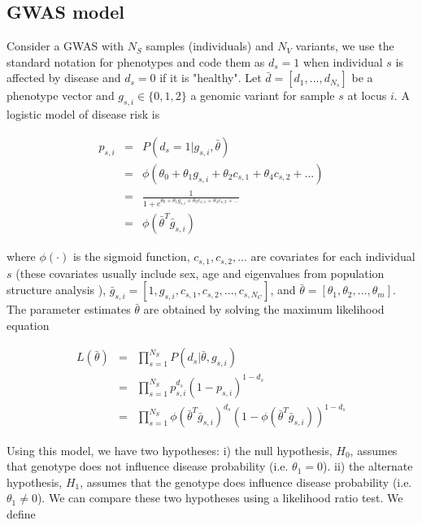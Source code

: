 \subsection{GWAS model}

Consider a GWAS with $N_S$  samples (individuals) and $N_V$ variants, we use the standard notation for phenotypes and code them as $d_s=1$ when individual $s$ is affected by disease and $d_s=0$ if it is "healthy". Let $\bar{d} = [d_1, ..., d_{N_s}]$ be a phenotype vector and $g_{s,i} \in \{0,1,2\}$ a genomic variant for sample $s$ at locus $i$. A logistic model of disease risk \cite{balding2006tutorial} is

\begin{eqnarray*}
    p_{s,i} & = & P( d_s=1 | g_{s,i}, \bar{\theta} ) \\
    & = & \phi( \theta_0 + \theta_1 g_{s,i} + \theta_2 c_{s,1} + \theta_4 c_{s,2} + ... ) \\
    & = & \frac{1}{1 + e^{\theta_0 + \theta_1 g_{s,i} + \theta_2 c_{s,1} + \theta_4 c_{s,2} + ...}} \\
    & = & \phi( \bar{\theta}^T \bar{g}_{s,i})
\end{eqnarray*}

\noindent where $\phi(\cdot)$ is the sigmoid function, $c_{s,1}, c_{s,2}, ... $ are covariates for each individual $s$ (these covariates usually include sex, age and eigenvalues from population structure analysis \cite{price2006principal}), $\bar{g}_{s,i} = [ 1, g_{s,i} , c_{s,1}, c_{s,2}, ... , c_{s,N_C} ]$, and $\bar{\theta} = [\theta_1, \theta_2, ..., \theta_m] $. The parameter estimates $\bar{\theta}$ are obtained by solving the maximum likelihood equation

\begin{eqnarray*}
    L( \bar{\theta} ) & = & \prod_{s=1}^{N_S}{ P( d_s | \bar{\theta}, g_{s,i} ) } \\
    & = & \prod_{s=1}^{N_S}{ p_{s,i}^{d_s} (1-p_{s,i})^{1-d_s} } \\
    & = & \prod_{s=1}^{N_S}{ \phi( \bar{\theta}^T \bar{g}_{s,i})^{d_s} (1-\phi( \bar{\theta}^T \bar{g}_{s,i}))^{1-d_s} }
\end{eqnarray*}


Using this model, we have two hypotheses: i) the null hypothesis, $H_0$, assumes that genotype does not influence disease probability (i.e. $\theta_1 = 0$). ii) the alternate hypothesis, $H_1$, assumes that the genotype does influence disease probability (i.e. $\theta_1 \neq 0$). We can compare these two hypotheses using a likelihood ratio test. We define


